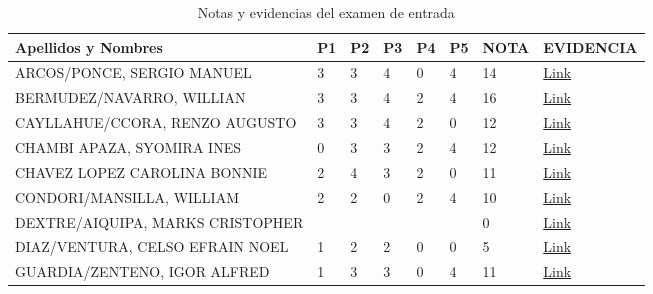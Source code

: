 \documentclass[11pt,fleqn]{book} %
\begin{document}
\begin{table}[]
	\caption{Notas y evidencias del examen de entrada}
	\label{tab:notas}
	\begin{tabular}{llllllll}
		\textbf{Apellidos y Nombres}        & \textbf{P1} & \textbf{P2} & \textbf{P3} & \textbf{P4} & \textbf{P5} & \textbf{NOTA} & \textbf{EVIDENCIA} \\
		\hline
		ARCOS/PONCE, SERGIO MANUEL          & 3           & 3           & 4           & 0           & 4           & 14            & \href{https://drive.google.com/open?id=1WYgqT2JCTGtzgXqbM5qQqxSmqwJcihF1}{Link}               \\
		BERMUDEZ/NAVARRO, WILLIAN    & 3           & 3           & 4           & 2           & 4           & 16            & \href{https://drive.google.com/open?id=1WYgqT2JCTGtzgXqbM5qQqxSmqwJcihF1}{Link}               \\
		CAYLLAHUE/CCORA, RENZO AUGUSTO      & 3           & 3           & 4           & 2           & 0           & 12            & \href{https://drive.google.com/open?id=1WYgqT2JCTGtzgXqbM5qQqxSmqwJcihF1}{Link}               \\
		CHAMBI APAZA, SYOMIRA INES          & 0           & 3           & 3           & 2           & 4           & 12            & \href{https://drive.google.com/open?id=1WYgqT2JCTGtzgXqbM5qQqxSmqwJcihF1}{Link}               \\
		CHAVEZ LOPEZ CAROLINA BONNIE        & 2           & 4           & 3           & 2           & 0           & 11            & \href{https://drive.google.com/open?id=1WYgqT2JCTGtzgXqbM5qQqxSmqwJcihF1}{Link}               \\
		CONDORI/MANSILLA, WILLIAM   & 2           & 2           & 0           & 2           & 4           & 10            & \href{https://drive.google.com/open?id=1WYgqT2JCTGtzgXqbM5qQqxSmqwJcihF1}{Link}               \\
		DEXTRE/AIQUIPA, MARKS CRISTOPHER    &             &             &             &             &             & 0             & \href{https://drive.google.com/open?id=1WYgqT2JCTGtzgXqbM5qQqxSmqwJcihF1}{Link}               \\
		DIAZ/VENTURA, CELSO EFRAIN NOEL     & 1           & 2           & 2           & 0           & 0           & 5             & \href{https://drive.google.com/open?id=1WYgqT2JCTGtzgXqbM5qQqxSmqwJcihF1}{Link}               \\
		GUARDIA/ZENTENO, IGOR ALFRED        & 1           & 3           & 3           & 0           & 4           & 11            & \href{https://drive.google.com/open?id=1WYgqT2JCTGtzgXqbM5qQqxSmqwJcihF1}{Link}               \\

\end{tabular}
\end{table}
\end{document}
